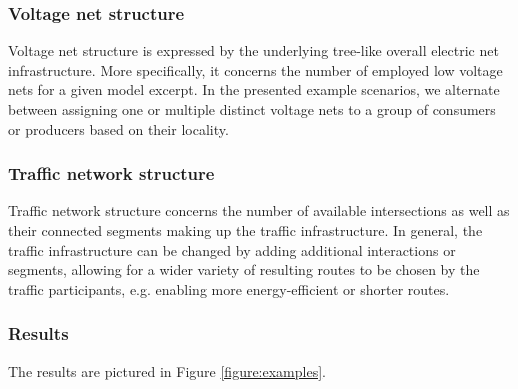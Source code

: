\subsubsection{Voltage net structure}
Voltage net structure is expressed by the underlying tree-like overall electric net infrastructure. More specifically, it concerns the number of employed low voltage nets for a given model excerpt. In the presented example scenarios, we alternate between assigning one or multiple distinct voltage nets to a group of consumers or producers based on their locality.

\subsubsection{Traffic network structure}
Traffic network structure concerns the number of available intersections as well as their connected segments making up the traffic infrastructure. In general, the traffic infrastructure can be changed by adding additional interactions or segments, allowing for a wider variety of resulting routes to be chosen by the traffic participants, e.g. enabling more energy-efficient or shorter routes.

\subsubsection{Results}
The results are pictured in Figure \ref{figure:examples}. 


